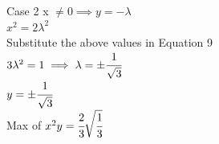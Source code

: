 \documentclass{beamer}
\begin{document}
\begin{frame}{Case 2}
x $\neq  0 \implies y = - \lambda$\\
\vspace{1em}
\pause $x^{2} = 2\lambda^{2}$ \\ \pause Substitute the above values in Equation 9\\
\vspace{1em}
\pause $3\lambda^{2} = 1 \implies \lambda = \pm \cfrac{1}{\sqrt{3}}$\\
\vspace{1em}
\pause $y = \pm \cfrac{1}{\sqrt{3}}$\\
\vspace{1em}
Max of $x^{2}y = \cfrac{2}{3} \sqrt{\cfrac{1}{3}}$
\end{frame}

{
	
}


%


\end{document}
